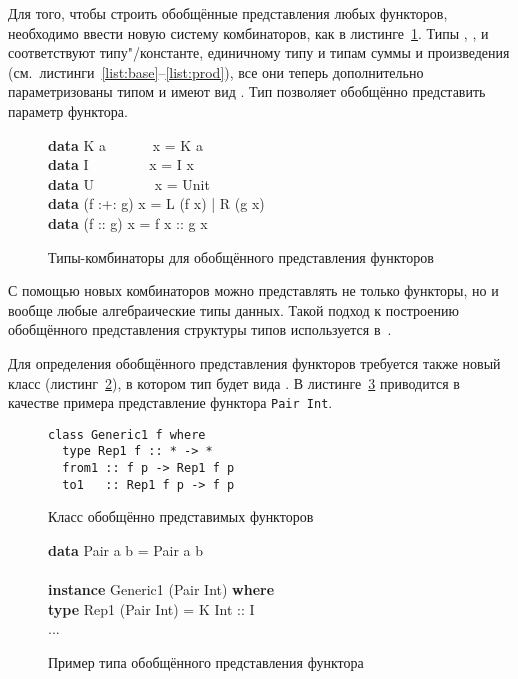 Для того, чтобы строить обобщённые представления любых
функторов, необходимо ввести новую систему комбинаторов, как в
листинге~\ref{list:combinators}. Типы , ,
 и  соответствуют
типу"/константе, единичному типу и типам суммы и произведения
(см.~листинги~\ref{list:base}--\ref{list:prod}), все они теперь
дополнительно параметризованы типом  и имеют вид
. Тип  позволяет обобщённо представить
параметр функтора.
\begin{figure}[h]
\begin{framed}
\ttfamily\small
\textbf{data} K a~~~~~~ x = K a\\
\textbf{data} I~~~~~~~~ x = I x\\
\textbf{data} U~~~~~~~~ x = Unit\\
\textbf{data} (f :+: g) x = L (f x) | R (g x)\\
\textbf{data} (f :\tms: g) x = f x :\tms: g x
\end{framed}
\caption{Типы-комбинаторы для обобщённого представления функторов}
\label{list:combinators}
\end{figure}

С помощью новых комбинаторов можно представлять не только
функторы, но и вообще любые алгебраические типы данных. Такой
подход к построению обобщённого представления структуры типов
используется в~\cite{MuRec2009}.

Для определения обобщённого представления функторов требуется
также новый класс  (листинг~\ref{list:generic1}), в
котором тип  будет вида . В
листинге~\ref{list:generic-pair} приводится в качестве примера
представление функтора \lstinline{Pair Int}.
\begin{figure}[h]
\begin{framed}
\vspace{-0.25cm}
\begin{lstlisting}
class Generic1 f where
  type Rep1 f :: * -> *
  from1 :: f p -> Rep1 f p
  to1   :: Rep1 f p -> f p
\end{lstlisting}
\vspace{-0.25cm}
\end{framed}
\caption{Класс обобщённо представимых функторов}
\label{list:generic1}
\end{figure}
\begin{figure}[h]
\begin{framed}
\ttfamily\small
\textbf{data} Pair a b = Pair a b\\
\\
\textbf{instance} Generic1 (Pair Int) \textbf{where}\\
\ind\textbf{type} Rep1 (Pair Int) = K Int :\tms: I\\
\ind ...
\end{framed}
\caption{Пример типа обобщённого представления функтора}
\label{list:generic-pair}
\end{figure}

